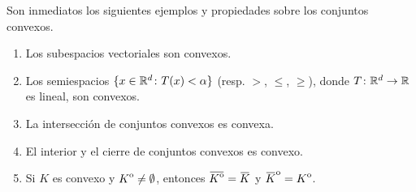 Son inmediatos los siguientes ejemplos y propiedades sobre los conjuntos convexos.

\begin{enumerate}
\item Los subespacios vectoriales son convexos.
\item Los semiespacios $\{x \in \mathbb{R}^d \colon T(x) < \alpha \}$ (resp. $>$, $\le$, $\ge$), donde $T \colon \mathbb{R}^d \to \mathbb{R}$ es lineal, son convexos.
\item La intersección de conjuntos convexos es convexa.
\item El interior y el cierre de conjuntos convexos es convexo.
\item Si $K$ es convexo y ${\kern0ptK}^{\mathrm{o}} \ne \emptyset$, entonces $\closure{\interior{K}} = \closure{K}$ y $\interior{\closure{K}} = \interior{K}$. 

\end{enumerate}

